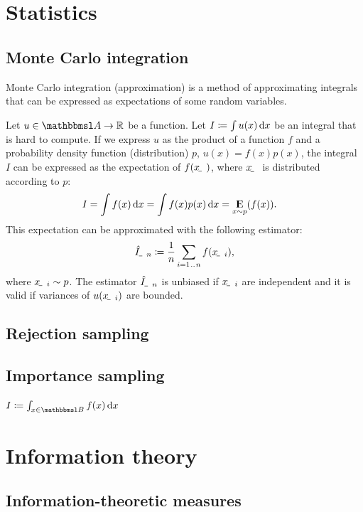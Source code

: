 \documentclass[twocolumn]{article}
\begin{document}
\section{Statistics}

\subsection{Monte Carlo integration}

Monte Carlo integration (approximation) is a method of approximating integrals that can be expressed as expectations of some random variables.

Let $u\in \set A\to \R$ be a function. Let $I\coloneqq\int u(x)\operatorname{d\!} x$ be an integral that is hard to compute. If we express $u$ as the product of a function $f$ and a probability density function (distribution) $p$, $u(x) = f(x)p(x)$, the integral $I$ can be expressed as the expectation of $f(\rvar x)$, where $\rvar x$ is distributed according to $p$:
\begin{align}
    I &= \int f(x)\operatorname{d\!} x = \int f(x)p(x)\operatorname{d\!} x = \operatorname*{\mathrm{I\kern-.282em E}}_{x\sim p}(f(x)) \text .
\end{align}
This expectation can be approximated with the following estimator:
\begin{align} 
    \rvar{\hat I}_n \coloneqq \frac{1}{n}\sum_{i=1\bidot n} f(\rvar x_i) \text{,}
\end{align}
where $\rvar x_i\sim p$. The estimator $\rvar{\hat I}_n$ is unbiased if $\rvar x_i$ are independent and it is valid if variances of $u(\rvar x_i)$ are bounded.

\subsection{Rejection sampling}

\subsection{Importance sampling}
$I\coloneqq\int_{x\in \set B}f(x)\dif x$

\section{Information theory}


\subsection{Information-theoretic measures}
\end{document}
